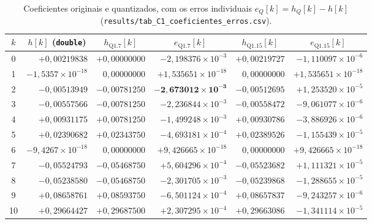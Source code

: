 \documentclass[11pt,a4paper]{article}
\begin{document}
\begin{table}[H]
    \centering
    \caption{Coeficientes originais e quantizados, com os erros individuais $e_Q[k] = h_Q[k] - h[k]$ (\texttt{results/tab\_C1\_coeficientes\_erros.csv}).}
    \label{tab:C1_coeficientes}
    \footnotesize
    \setlength{\tabcolsep}{5pt}
    \begin{adjustbox}{max width=\textwidth}
    \begin{tabular}{@{}crrrrr@{}}
        \toprule
        \textbf{$k$} & \multicolumn{1}{c}{\textbf{$h[k]$ (\texttt{double})}} & \multicolumn{1}{c}{\textbf{$h_{\text{Q1.7}}[k]$}} & \multicolumn{1}{c}{\textbf{$e_{\text{Q1.7}}[k]$}} & \multicolumn{1}{c}{\textbf{$h_{\text{Q1.15}}[k]$}} & \multicolumn{1}{c}{\textbf{$e_{\text{Q1.15}}[k]$}} \\
        \midrule
        \rowcolor{rowfail}
        0  & $+0,00219838$ & $+0,00000000$ & $-2,198376\times 10^{-3}$ & $+0,00219727$ & $-1,110097\times 10^{-6}$ \\
        1  & $-1,5357\times 10^{-18}$ & $0,00000000$ & $+1,535651\times 10^{-18}$ & $0,00000000$ & $+1,535651\times 10^{-18}$ \\
        2  & $-0,00513949$ & $-0,00781250$ & $\mathbf{-2,673012\times 10^{-3}}$ & $-0,00512695$ & $+1,253520\times 10^{-5}$ \\
        3  & $-0,00557566$ & $-0,00781250$ & $-2,236844\times 10^{-3}$ & $-0,00558472$ & $-9,061077\times 10^{-6}$ \\
        4  & $+0,00931175$ & $+0,00781250$ & $-1,499248\times 10^{-3}$ & $+0,00930786$ & $-3,886926\times 10^{-6}$ \\
        5  & $+0,02390682$ & $+0,02343750$ & $-4,693181\times 10^{-4}$ & $+0,02389526$ & $-1,155439\times 10^{-5}$ \\
        6  & $-9,4267\times 10^{-18}$ & $0,00000000$ & $+9,426665\times 10^{-18}$ & $0,00000000$ & $+9,426665\times 10^{-18}$ \\
        7  & $-0,05524793$ & $-0,05468750$ & $+5,604296\times 10^{-4}$ & $-0,05523682$ & $+1,111321\times 10^{-5}$ \\
        8  & $-0,05238580$ & $-0,05468750$ & $-2,301705\times 10^{-3}$ & $-0,05239868$ & $-1,288655\times 10^{-5}$ \\
        9  & $+0,08658761$ & $+0,08593750$ & $-6,501124\times 10^{-4}$ & $+0,08657837$ & $-9,243257\times 10^{-6}$ \\
        10 & $+0,29664427$ & $+0,29687500$ & $+2,307295\times 10^{-4}$ & $+0,29663086$ & $-1,341114\times 10^{-5}$ \\

\end{tabular}
\end{adjustbox}
\end{table}
\end{document}

